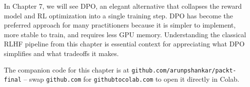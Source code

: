\begin{chapterenv}
In Chapter 7, we will see DPO, an elegant alternative that collapses the reward model and RL optimization into a single training step. DPO has become the preferred approach for many practitioners because it is simpler to implement, more stable to train, and requires less GPU memory. Understanding the classical RLHF pipeline from this chapter is essential context for appreciating what DPO simplifies and what tradeoffs it makes.


The companion code for this chapter is at \texttt{github.com/arunpshankar/packt-final} -- swap \texttt{github.com} for \texttt{githubtocolab.com} to open it directly in Colab.

\end{chapterenv}